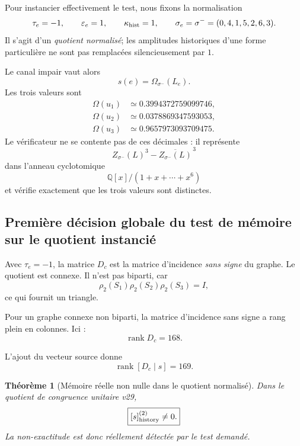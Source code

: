 \documentclass[11pt,a4paper]{article}
\newtheorem{theorem}{Théorème}[section]
\newcommand{\rank}{\operatorname{rank}}
\begin{document}
Pour instancier effectivement le test, nous fixons la normalisation
\[
 \tau_e=-1,\qquad
 \varepsilon_e=1,\qquad
 \kappa_{\rm hist}=1,
 \qquad
 \sigma_e=\sigma^-=(0,4,1,5,2,6,3).
\]
Il s'agit d'un \emph{quotient normalisé}; les amplitudes historiques d'une forme particulière ne sont pas remplacées silencieusement par $1$.

Le canal impair vaut alors
\[
 s(e)=\Omega_{\sigma^-}(L_e).
\]
Les trois valeurs sont
\begin{equation}\label{eq:v29-Omega-three}
 \boxed{
 \begin{aligned}
 \Omega(u_1)&\simeq0.3994372759099746,\\
 \Omega(u_2)&\simeq0.0378869347593053,\\
 \Omega(u_3)&\simeq0.9657973093709475.
 \end{aligned}}
\end{equation}
Le vérificateur ne se contente pas de ces décimales : il représente
\[
 Z_{\sigma^-}(L)^3-\overline{Z_{\sigma^-}(L)}^{\,3}
\]
dans l'anneau cyclotomique
\[
 \mathbb Q[x]/(1+x+\cdots+x^6)
\]
et vérifie exactement que les trois valeurs sont distinctes.

\subsection{Première décision globale du test de mémoire sur le quotient instancié}

Avec $\tau_e=-1$, la matrice $D_c$ est la matrice d'incidence \emph{sans signe} du graphe. Le quotient est connexe. Il n'est pas biparti, car
\[
 \boxed{
 \rho_2(S_1)\rho_2(S_2)\rho_2(S_3)=I,}
\]
ce qui fournit un triangle.

Pour un graphe connexe non biparti, la matrice d'incidence sans signe a rang plein en colonnes. Ici :
\begin{equation}\label{eq:v29-rank-Dc}
 \boxed{
 \rank D_c=168.}
\end{equation}

L'ajout du vecteur source donne
\begin{equation}\label{eq:v29-rank-history}
 \boxed{
 \rank[D_c\mid s]=169.}
\end{equation}

\begin{theorem}[Mémoire réelle non nulle dans le quotient normalisé]\label{thm:v29-history-nonzero}
Dans le quotient de congruence unitaire v29,
\[
 \boxed{
 [s]_{\rm history}^{(2)}\neq0.}
\]
La non-exactitude est donc réellement détectée par le test demandé.
\end{theorem}
\end{document}
